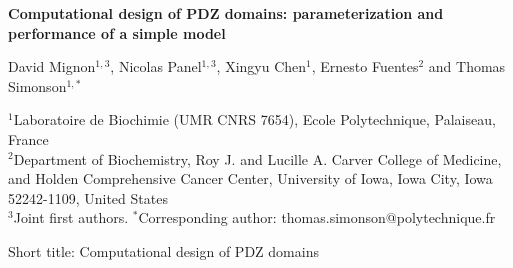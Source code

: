 \documentclass[12pt]{article}
\begin{document}
 

\parindent 0mm


\vspace{5cm}

\begin{center}

\Large 
 
{\bf Computational design of PDZ domains: parameterization and performance of a simple model}
 
\vspace{1cm}

\normalsize

David Mignon$^{1,3}$, Nicolas Panel$^{1,3}$, Xingyu Chen$^1$, Ernesto Fuentes$^2$ and Thomas Simonson$^{1,\ast}$
 
\vspace{1cm}

$^1$Laboratoire de Biochimie (UMR CNRS 7654), Ecole Polytechnique, Palaiseau, France \\
$^2$Department of Biochemistry, Roy J. and Lucille A. Carver College of Medicine, and
Holden Comprehensive Cancer Center, University of Iowa, Iowa City, Iowa 52242-1109, United States \\
$^3$Joint first authors. $^{\ast}$Corresponding author: thomas.simonson@polytechnique.fr 

\end{center} 

\vfill

Short title: Computational design of PDZ domains 

\pagebreak
\end{document}

